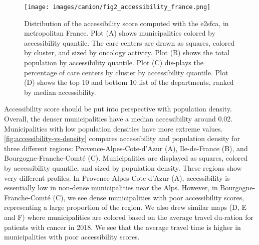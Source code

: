 \begin{figure}[H]
    \texttt{[image: images/camion/fig2\_accessibility\_france.png]}
    \centering
    \caption{
        Distribution of the accessibility score computed with the \ac{e2sfca}, in metropolitan France. Plot (A) shows municipalities colored by accessibility quantile. The care centers are drawn as squares, colored by cluster, and sized by oncology activity. Plot (B) shows the total population by accessibility quantile. Plot (C) dis-plays the percentage of care centers by cluster by accessibility quantile. Plot (D) shows the top 10 and bottom 10 list of the departments, ranked by median accessibility.
    }
    \label{fig:accessibility-france}
\end{figure}

Accessibility score should be put into perspective with population density. Overall, the denser municipalities have a median accessibility around 0.02. Municipalities with low population densities have more extreme values.  \cref{fig:accessibility-vs-density} compares accessibility and population density for three different regions: Provence-Alpes-Cote-d'Azur (A), Ile-de-France (B), and Bourgogne-Franche-Comté (C). Municipalities are displayed as squares, colored by accessibility quantile, and sized by population density. These regions show very different profiles. In Provence-Alpes-Cote-d'Azur (A), accessibility is essentially low in non-dense municipalities near the Alps. However, in Bourgogne-Franche-Comté (C), we see dense municipalities with poor accessibility scores, representing a large proportion of the region. We also drew similar maps (D, E and F) where municipalities are colored based on the average travel du-ration for patients with cancer in 2018. We see that the average travel time is higher in municipalities with poor accessibility scores.

